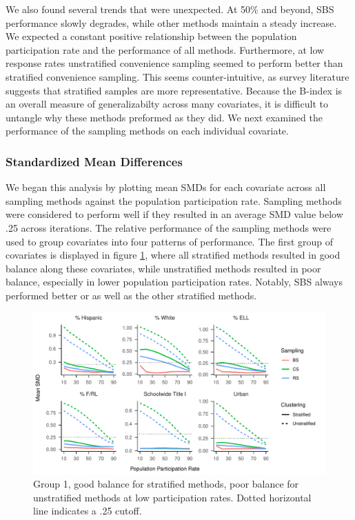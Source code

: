 \documentclass[
  english,
  man,floatsintext]{apa6}
\begin{document}
We also found several trends that were unexpected. At 50\% and beyond, SBS performance slowly degrades, while other methods maintain a steady increase. We expected a constant positive relationship between the population participation rate and the performance of all methods. Furthermore, at low response rates unstratified convenience sampling seemed to perform better than stratified convenience sampling. This seems counter-intuitive, as survey literature suggests that stratified samples are more representative. Because the B-index is an overall measure of generalizabilty across many covariates, it is difficult to untangle why these methods preformed as they did. We next examined the performance of the sampling methods on each individual covariate.

\hypertarget{standardized-mean-differences}{%
\subsubsection{Standardized Mean Differences}\label{standardized-mean-differences}}

We began this analysis by plotting mean SMDs for each covariate across all sampling methods against the population participation rate. Sampling methods were considered to perform well if they resulted in an average SMD value below .25 across iterations. The relative performance of the sampling methods were used to group covariates into four patterns of performance. The first group of covariates is displayed in figure \ref{fig:fig-SMD-by-Var-good1}, where all stratified methods resulted in good balance along these covariates, while unstratified methods resulted in poor balance, especially in lower population participation rates. Notably, SBS always performed better or as well as the other stratified methods.

\begin{figure}
\centering
\includegraphics{GenSamp-Paper_files/figure-latex/fig-SMD-by-Var-good1-1.pdf}
\caption{\label{fig:fig-SMD-by-Var-good1}Group 1, good balance for stratified methods, poor balance for unstratified methods at low participation rates. Dotted horizontal line indicates a .25 cutoff.}
\end{figure}
\end{document}
